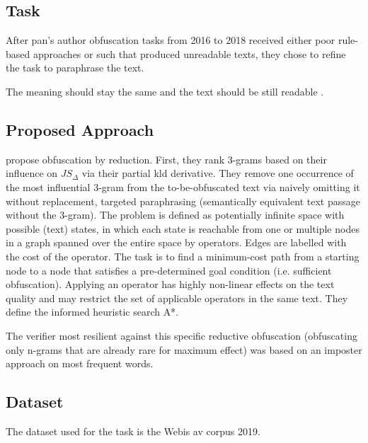 \subsection{Task}
After \ac{pan}'s author obfuscation tasks from 2016 to 2018 received either poor rule-based approaches or such that 
produced unreadable texts, they chose to refine the task to paraphrase the text.

\begin{definition}
    [Paraphrase]
    The meaning should stay the same and the text should be still readable \citep{bevendorff_divergence_based_2020}.
\end{definition}

\subsection{Proposed Approach}
\citet{bevendorff_divergence_based_2020} propose obfuscation by reduction.
First, they rank 3-grams based on their influence on $JS_\Delta$ via their partial \ac{kld} derivative.
They remove one occurrence of the most influential 3-gram from the to-be-obfuscated text via naively omitting it without replacement, 
targeted paraphrasing (semantically equivalent text passage without the 3-gram).
The problem is defined as potentially infinite space with possible (text) states, 
in which each state is reachable from one or multiple nodes in a graph spanned over the entire space by operators.
Edges are labelled with the cost of the operator.
The task is to find a minimum-cost path from a starting node to a node that satisfies a pre-determined goal condition 
(i.e. sufficient obfuscation).
Applying an operator has highly non-linear effects on the text quality and may restrict the set of applicable operators in the same text.
They define the informed heuristic search A*.

The verifier most resilient against this specific reductive obfuscation (obfuscating only n-grams that are already rare for maximum effect) 
was based on an imposter approach on most frequent words.

\subsection{Dataset}
The dataset used for the task is the Webis \acl{av} corpus 2019.